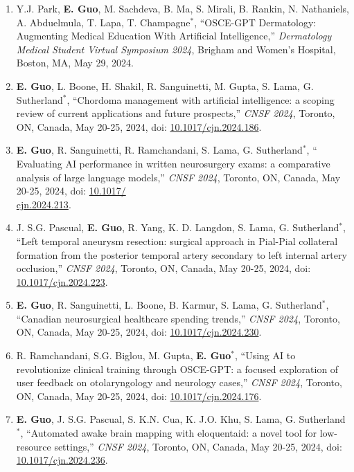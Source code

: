 \documentclass{article}
\begin{document}
\begin{enumerate}
    \item Y.J. Park, \textbf{E. Guo}, M. Sachdeva, B. Ma, S. Mirali, B. Rankin, N. Nathaniels, A. Abduelmula, T. Lapa, T. Champagne$^*$, ``OSCE-GPT Dermatology: Augmenting Medical Education With Artificial Intelligence,'' \textit{Dermatology Medical Student Virtual Symposium 2024}, Brigham and Women’s Hospital, Boston, MA, May 29, 2024.
    \item \textbf{E. Guo}, L. Boone, H. Shakil, R. Sanguinetti, M. Gupta, S. Lama, G. Sutherland$^*$, ``Chordoma management with artificial intelligence: a scoping review of current applications and future prospects,'' \textit{CNSF 2024}, Toronto, ON, Canada, May 20-25, 2024, doi: \href{https://doi.org/10.1017/cjn.2024.186}{10.1017/cjn.2024.186}.
    \item \textbf{E. Guo}, R. Sanguinetti, R. Ramchandani, S. Lama, G. Sutherland$^*$, ``
    Evaluating AI performance in written neurosurgery exams: a comparative analysis of large language models,'' \textit{CNSF 2024}, Toronto, ON, Canada, May 20-25, 2024, doi: \href{https://doi.org/10.1017/cjn.2024.213}{10.1017/\\cjn.2024.213}.
    \item J. S.G. Pascual, \textbf{E. Guo}, R. Yang, K. D. Langdon, S. Lama, G. Sutherland$^*$, ``Left temporal aneurysm resection: surgical approach in Pial-Pial collateral formation from the posterior temporal artery secondary to left internal artery occlusion,'' \textit{CNSF 2024}, Toronto, ON, Canada, May 20-25, 2024, doi: \href{https://doi.org/10.1017/cjn.2024.223}{10.1017/cjn.2024.223}.
    \item \textbf{E. Guo}, R. Sanguinetti, L. Boone, B. Karmur, S. Lama, G. Sutherland$^*$, ``Canadian neurosurgical healthcare spending trends,'' \textit{CNSF 2024}, Toronto, ON, Canada, May 20-25, 2024, doi: \href{https://doi.org/10.1017/cjn.2024.230}{10.1017/cjn.2024.230}.
    \item R. Ramchandani, S.G. Biglou, M. Gupta, \textbf{E. Guo}$^*$, ``Using AI to revolutionize clinical training through OSCE-GPT: a focused exploration of user feedback on otolaryngology and neurology cases,'' \textit{CNSF 2024}, Toronto, ON, Canada, May 20-25, 2024, doi: \href{https://doi.org/10.1017/cjn.2024.176}{10.1017/cjn.2024.176}.
    \item \textbf{E. Guo}, J. S.G. Pascual, S. K.N. Cua, K. J.O. Khu, S. Lama, G. Sutherland$^*$, ``Automated awake brain mapping with eloquentaid: a novel tool for low-resource settings,'' \textit{CNSF 2024}, Toronto, ON, Canada, May 20-25, 2024, doi: \href{https://doi.org/10.1017/cjn.2024.236}{10.1017/cjn.2024.236}.

\end{enumerate}
\end{document}
